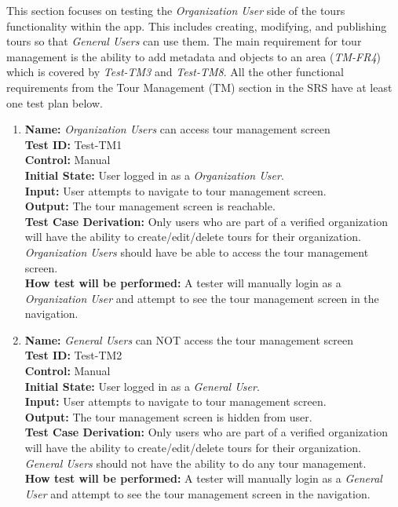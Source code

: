 \documentclass[12pt, titlepage]{article}
\begin{document}
This section focuses on testing the \textit{Organization User} side of the tours functionality within the app. This includes creating, modifying, and publishing tours so that \textit{General Users} can use them. The main requirement for tour management is the ability to add metadata and objects to an area (\textit{TM-FR4}) which is covered by \textit{Test-TM3} and \textit{Test-TM8}. All the other functional requirements from the Tour Management (TM) section in the SRS \cite{SRS} have at least one test plan below.

\begin{enumerate}

    \item
    \textbf{Name:} \textit{Organization Users} can access tour management screen \label{itm:Test-TM1} \\
    \textbf{Test ID:} Test-TM1 \\
    \textbf{Control:} Manual \\
    \textbf{Initial State:} User logged in as a \textit{Organization User}. \\
    \textbf{Input:} User attempts to navigate to tour management screen. \\
    \textbf{Output:} The tour management screen is reachable. \\
    \textbf{Test Case Derivation:} Only users who are part of a verified organization will have the ability to create/edit/delete tours for their organization. \textit{Organization Users} should have be able to access the tour management screen. \\
    \textbf{How test will be performed:} A tester will manually login as a \textit{Organization User} and attempt to see the tour management screen in the navigation.

    \item
    \textbf{Name:} \textit{General Users} can NOT access the tour management screen \label{itm:Test-TM2} \\
    \textbf{Test ID:} Test-TM2 \\
    \textbf{Control:} Manual \\
    \textbf{Initial State:} User logged in as a \textit{General User}. \\
    \textbf{Input:} User attempts to navigate to tour management screen. \\
    \textbf{Output:} The tour management screen is hidden from user. \\
    \textbf{Test Case Derivation:} Only users who are part of a verified organization will have the ability to create/edit/delete tours for their organization. \textit{General Users} should not have the ability to do any tour management. \\
    \textbf{How test will be performed:} A tester will manually login as a \textit{General User} and attempt to see the tour management screen in the navigation.


\end{enumerate}
\end{document}
